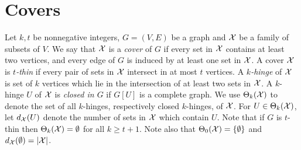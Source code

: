 \documentclass[11pt]{article}
\begin{document}
\section{Covers}
Let $k,t$ be nonnegative integers, $G=(V,E)$ be a graph and $\cal X$
be a family of subsets of $V$. We say that $\cal X$ is a {\em cover}
of $G$ if every set in ${\cal X}$ contains at least two vertices, and
every edge of $G$ is induced by at least one set in $\cal X$. A
cover $\cal X$ is {\em $t$-thin} if every pair of sets in ${\cal X}$
intersect in at most $t$ vertices. A {\em $k$-hinge} of $\cal X$ is
set of $k$ vertices which lie in the intersection of at least two
sets in $\cal X$. A $k$-hinge $U$ of ${\cal X}$ is {\em closed in $G$}
if $G[U]$ is a complete graph. We use $\Theta_k({\cal X})$
to denote the set of all
$k$-hinges, respectively closed $k$-hinges, of $\cal X$. For $U\in
\Theta_k({\cal X})$, let $d_\calx(U)$ denote the number of sets in
$\cal X$ which contain $U$. Note that if $G$ is $t$-thin then
$\Theta_k({\cal X})=\emptyset$ for all $k\geq t+1$. Note also that
$\Theta_0({\cal X})=\{\emptyset\}$ and $d_{\cal X}(\emptyset)=|{\cal X}|$.

\iffalse
\begin{lemma}\label{covercount}
Let $\cal X$ be a cover of a graph $G=(V,E)$. Then
\begin{equation}\label{cover1}
 |V|=\sum_{X\in \calx}|X|-\sum_{U\in \Theta_1(\calx)}(d_\calx(U)-1)
\end{equation}
and
\begin{equation}\label{cover2}
 |E|=\sum_{X\in \calx}i_G(X)-\sum_{U\in
\widehat\Theta_2(\calx)}(d_\calx(U)-1).
\end{equation}
\end{lemma}
\bproof We first prove (\ref{cover1}). Choose $v\in V$. If $U=\{v\}$
is not a 1-hinge of $\cal X$ then the sum $\sum_{X\in \calx}|X|$
counts $v$ exactly once. If $U$ is a 1-hinge of $\cal X$ then this
sum counts $v$ exactly $d_\calx(U)$ times. Equation (\ref{cover2})
can be proved similarly.
\eproof \fi
\end{document}
